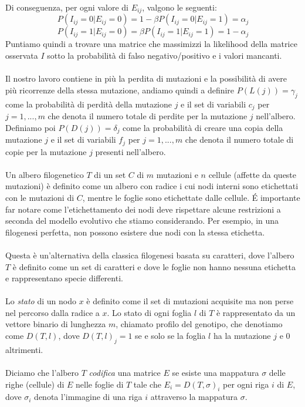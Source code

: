 \documentclass[12pt]{report}
\begin{document}
  Di conseguenza, per ogni valore di ${E}_{ij}$, valgono le seguenti:
  \[
    P(I_{ij} = 0|{E}_{ij} = 0) = 1 - \beta P(I_{ij} = 0|E_{ij} = 1) = \alpha_{j}
  \]
  \[
    P(I_{ij} = 1|E_{ij} = 0) = \beta P(I_{ij} = 1|E_{ij} = 1) = 1 - \alpha_{j}
  \]
  Puntiamo quindi a trovare una matrice che massimizzi la likelihood della matrice osservata $I$ sotto la probabilità di falso negativo/positivo e i valori mancanti.\\\\
  Il nostro lavoro contiene in più la perdita di mutazioni e la possibilità di avere più ricorrenze della stessa mutazione, andiamo quindi a definire $P(L(j))={\gamma}_{j}$ come la probabilità di perdità della mutazione $j$ e il set di variabili ${c}_{j}$ per $j=1,...,m$ che denota il numero totale di perdite per la mutazione $j$ nell'albero.
  Definiamo poi $P(D(j))={\delta}_{j}$ come la probabilità di creare una copia della mutazione $j$ e il set di variabili ${f}_{j}$ per $j=1,...,m$ che denota il numero totale di copie per la mutazione $j$ presenti nell'albero.\\\\
  Un albero filogenetico $T$ di un set $C$ di $m$ mutazioni e $n$ cellule (affette da queste mutazioni) è definito come un albero con radice i cui nodi interni sono etichettati con le mutazioni di $C$, mentre le foglie sono etichettate dalle cellule.
  \'E importante far notare come l'etichettamento dei nodi deve rispettare alcune restrizioni a seconda del modello evolutivo che stiamo considerando. Per esempio, in una filogenesi perfetta, non possono esistere due nodi con la stessa etichetta.\\\\
  Questa è un'alternativa della classica filogenesi basata su caratteri, dove l'albero $T$ è definito come un set di caratteri e dove le foglie non hanno nessuna etichetta e rappresentano specie differenti.\\\\
  Lo \emph{stato} di un nodo $x$ è definito come il set di mutazioni acquisite ma non perse nel percorso dalla radice a $x$. Lo stato di ogni foglia $l$ di $T$ è rappresentato da un vettore binario di lunghezza $m$, chiamato profilo del genotipo, che denotiamo come $D(T, l)$, dove $D{(T, l)}_{j}=1$ se e solo se la foglia $l$ ha la mutazione $j$ e 0 altrimenti.\\\\
  Diciamo che l'albero $T$ \emph{codifica} una matrice $E$ se esiste una mappatura $\sigma$ delle righe (cellule) di $E$ nelle foglie di $T$ tale che $E_{i}=D(T, \sigma)_{i}$ per ogni riga $i$ di $E$, dove ${\sigma}_{i}$ denota l'immagine di una riga $i$ attraverso la mappatura $\sigma$.
\end{document}
